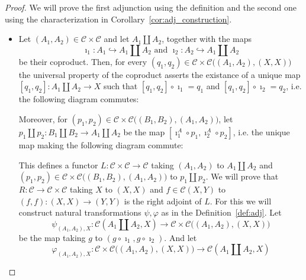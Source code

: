 \begin{proof} We will prove the first adjunction using the definition and the second one using the characterization in Corollary~\ref{cor:adj_construction}.
\begin{itemize}
\item Let $(A_1,A_2)\in\mathcal{C}\times\mathcal{C}$ and let $A_1\amalg A_2$, together with the maps \[\imath_1:A_1\hookrightarrow A_1\amalg A_2\text{ and }\imath_2:A_2\hookrightarrow A_1\amalg A_2\]
be their coproduct. Then, for every $(q_1,q_2)\in\mathcal{C}\times\mathcal{C}\big((A_1,A_2),(X,X)\big)$ the universal property of the coproduct asserts the existance of a unique map $[q_1,q_2]:A_1\amalg A_2\to X$ such that $[q_1,q_2]\circ\imath_1=q_1$ and $[q_1,q_2]\circ\imath_2=q_2$, i.e. the following diagram commutes:
\begin{center}
\end{center}
Moreover, for $(p_1,p_2)\in\mathcal{C}\times\mathcal{C}\big((B_1,B_2),(A_1,A_2)\big)$, let $p_1\amalg p_2:B_1\amalg B_2\to A_1\amalg A_2$ be the map $[\imath^A_1\circ p_1,\imath^A_2\circ p_2]$, i.e. the unique map making the following diagram commute:
\begin{center}
\end{center}
This defines a functor $L:\mathcal{C}\times\mathcal{C}\to\mathcal{C}$ taking $(A_1,A_2)$ to $A_1\amalg A_2$ and $(p_1,p_2)\in\mathcal{C}\times\mathcal{C}\big((B_1,B_2),(A_1,A_2)\big)$ to $p_1\amalg p_2$. We will prove that $R:\mathcal{C}\to\mathcal{C}\times\mathcal{C}$ taking $X$ to $(X,X)$ and $f\in\mathcal{C}(X,Y)$ to $(f,f):(X,X)\to (Y,Y)$ is the right adjoint of $L$. For this we will construct natural transformations $\psi,\varphi$ as in the Definition~\ref{def:adj}. Let
\[\psi_{(A_1,A_2),X}:\mathcal{C}(A_1\amalg A_2,X)\to\mathcal{C}\times\mathcal{C}\big((A_1,A_2),(X,X)\big)\]
be the map taking $g$ to $(g\circ\imath_1,g\circ\imath_2)$. And let
\[\varphi_{(A_1,A_2),X}:\mathcal{C}\times\mathcal{C}\big((A_1,A_2),(X,X)\big)\to\mathcal{C}(A_1\amalg A_2,X)\]

\end{itemize}
\end{proof}
